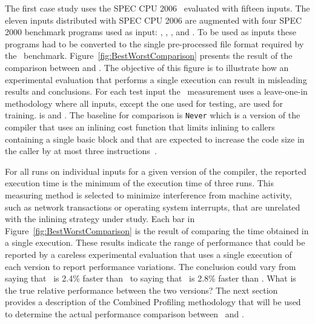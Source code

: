 The first case study uses the SPEC CPU 2006  \gcc\ evaluated with fifteen inputs. The eleven inputs distributed with SPEC CPU 2006 are augmented with  four SPEC 2000 benchmark programs used as input: \bzip, \lbm, \mcf, and \parser. To be used as inputs these programs had to be converted to the single pre-processed file format required by the \gcc\ benchmark.
Figure~\ref{fig:BestWorstComparison}  presents the result of the comparison between \llvm and \FDI. The objective of this figure is to illustrate how an experimental evaluation that performs a single execution can result in misleading results and conclusions. For each test input the \FDI\ measurement uses a leave-one-in methodology where all inputs, except the one used for testing, are used for training. is and \llvm. The baseline for comparison is  {\tt Never} which is a version of the compiler that uses an inlining cost function that limits inlining to callers containing a single basic block and that are expected to increase the code size in the caller by at most three instructions~\cite{BerubePhD}.

For all runs on individual inputs for a given version of the compiler, the reported execution time is the minimum of the execution time of three runs. This measuring method is selected to minimize interference from machine activity, such as network transactions or operating system interrupts, that are unrelated with the inlining strategy under study.  Each bar in Figure~\ref{fig:BestWorstComparison} is the result of comparing the time obtained in a single execution. These results indicate the range of performance that could be reported by a careless experimental evaluation that uses a single execution of each version to report performance variations. The conclusion could vary from saying that \FDI\ is 2.4\% faster than \llvm\ to saying that \llvm\ is 2.8\% faster than \FDI. What is the true relative performance between the two versions? The next section provides a description of the Combined Profiling methodology that will be used to determine the actual performance comparison between \FDI\ and \llvm.
 
